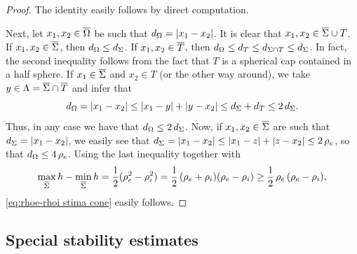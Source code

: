 \documentclass[a4paper,10pt]{amsart}
\numberwithin{equation}{section}
\begin{document}

\begin{proof}
The identity easily follows by direct computation. 
\par
Next, let $x_1, x_2\in\overline{\Omega}$ be such that $d_\Omega=|x_1-x_2|$. It is clear that $x_1, x_2\in \overline{\Sigma} \cup T$. If $x_1, x_2\in \overline{\Sigma}$, then $d_\Omega\le d_\Sigma$. If  $x_1, x_2\in \overline{T}$, then $d_\Omega\le d_T\le d_{\Sigma\cap T}\le d_\Sigma$. In fact, the second inequality follows from the fact that $T$ is a spherical cap contained in a half sphere. If $x_1\in \overline{\Sigma}$ and $x_2\in T$ (or the other way around), we take $y\in \Lambda = \overline{\Sigma}\cap \overline{T}$ and infer that
$$
d_\Omega=|x_1-x_2|\le |x_1-y|+|y-x_2|\le d_\Sigma+d_T\le 2\,d_\Sigma.
$$
Thus, in any case we have that $d_\Omega\le 2\,d_\Sigma$.
Now, if $x_1, x_2\in \overline{\Sigma}$ are such that $d_\Sigma=|x_1-x_2|$, we easily see that $d_\Sigma=|x_1-x_2|\le |x_1-z|+|z-x_2|\le 2\,\rho_e$, so that $d_\Omega\le 4\,\rho_e$.
Using the last inequality together with
$$
\max_{ \overline{\Sigma}} h - \min_{ \overline{\Sigma} } h = \frac{1}{2}(\rho^2_e - \rho^2_i)=
\frac12\,(\rho_e+\rho_i)(\rho_e-\rho_i)\ge \frac12\,\rho_e\,(\rho_e-\rho_i) ,
$$
\eqref{eq:rhoe-rhoi stima cone} easily follows.
\end{proof}	
	
	
\subsection{Special stability estimates}
\label{subsec:special-estimates}
\end{document}
